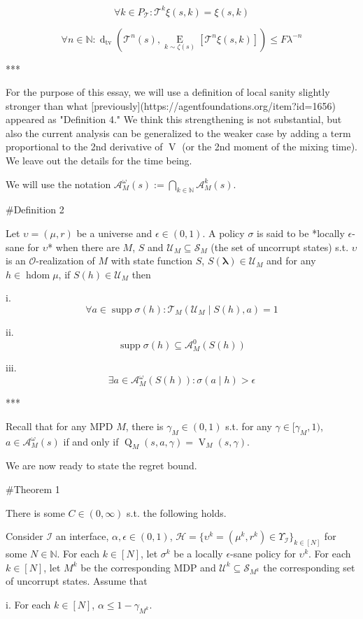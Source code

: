 \documentclass[a4paper]{article}
\DeclareMathOperator{\Supp}{supp}
\newcommand{\AP}[1]{\left(#1\right)}
\newcommand{\AB}[1]{\left[#1\right]}
\newcommand{\Ea}[2]{\underset{#1}{\operatorname{E}}\AB{#2}}
\newcommand{\Dtva}[1]{\operatorname{d}_{\text{tv}}\AP{#1}}
\newcommand{\Nats}{\mathbb{N}}
\newcommand{\Estr}{\boldsymbol{\lambda}}
\newcommand{\Ob}{\mathcal{O}}
\newcommand{\A}{\mathcal{A}}
\newcommand{\St}{\mathcal{S}}
\newcommand{\T}{\mathcal{T}}
\newcommand{\In}{\mathcal{I}}
\DeclareMathOperator{\HD}{hdom}
\newcommand{\Hy}{\mathcal{H}}
\newcommand{\UC}{\mathcal{U}}
\newcommand{\V}{\operatorname{V}}
\newcommand{\Q}{\operatorname{Q}}
\newcommand{\Pd}{P}
\begin{document}
$$\forall k \in \Pd_\T: \T^k \xi(s,k) = \xi(s,k)$$

$$\forall n \in \Nats: \Dtva{\T^n(s),\Ea{k \sim \zeta(s)}{\T^n \xi(s,k)}} \leq F \lambda^{-n}$$

***

For the purpose of this essay, we will use a definition of local sanity slightly stronger than what [previously](https://agentfoundations.org/item?id=1656) appeared as "Definition 4." We think this strengthening is not substantial, but also the current analysis can be generalized to the weaker case by adding a term proportional to the 2nd derivative of $\V$ (or the 2nd moment of the mixing time). We leave out the details for the time being.

We will use the notation $\A_M^\omega(s):=\bigcap_{k\in\Nats} \A_M^k(s)$.

\#Definition 2

Let $\upsilon = (\mu,r)$ be a universe and $\epsilon \in (0,1)$. A policy $\sigma$ is said to be *locally $\epsilon$-sane for $\upsilon$* when there are $M$, $S$ and $\UC_M \subseteq \St_M$ (the set of uncorrupt states) s.t. $\upsilon$ is an $\Ob$-realization of $M$ with state function $S$, $S(\Estr) \in \UC_M$ and for any $h \in \HD{\mu}$, if $S(h) \in \UC_M$ then

i. $$\forall a \in \Supp{\sigma(h)}: \T_M\AP{\UC_M \mid S(h),a} = 1$$

ii. $$\Supp{\sigma(h)} \subseteq \A_M^0\left(S(h)\right)$$

iii. $$\exists a \in \A_M^\omega\AP{S(h)}: \sigma(a \mid h) > \epsilon$$

***

Recall that for any MPD $M$, there is $\gamma_M\in(0,1)$ s.t. for any $\gamma\in[\gamma_M,1)$, $a \in \A_M^\omega(s)$ if and only if $\Q_M(s,a,\gamma)=\V_M(s,\gamma)$.

We are now ready to state the regret bound.

\#Theorem 1

There is some $C \in (0,\infty)$ s.t. the following holds.

Consider $\In$ an interface, $\alpha,\epsilon \in (0,1)$, $\Hy = \{\upsilon^k = (\mu^k,r^k) \in \Upsilon_{\In}\}_{k \in [N]}$ for some $N \in \Nats$. For each $k \in [N]$, let $\sigma^k$ be a locally $\epsilon$-sane policy for $\upsilon^k$. For each $k \in [N]$, let $M^k$ be the corresponding MDP and $\UC^k \subseteq \St_{M^k}$ the corresponding set of uncorrupt states. Assume that 

i. For each $k \in [N]$, $\alpha \leq 1 - \gamma_{M^k}$.
\end{document}
